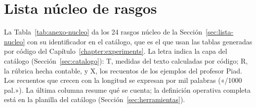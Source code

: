 \appendix
\renewcommand{\appendixname}{Anexo}

\chapter{Lista núcleo de rasgos}\label{app:nucleo}

La Tabla~\ref{tab:anexo-nucleo} da los 24 rasgos núcleo de la Sección~\ref{sec:lista-nucleo} con su
identificador en el catálogo, que es el que usan las tablas generadas por código del
Capítulo~\ref{chapter:experiments}. La letra indica la capa del catálogo
(Sección~\ref{sec:catalogo}): T, medidas del texto calculadas por código; R, la rúbrica hecha
contable, y X, los recuentos de los ejemplos del profesor Piad. Los recuentos que crecen con la longitud se
expresan por mil palabras («/1000 pal.»). La última columna resume qué se cuenta; la definición
operativa completa está en la planilla del catálogo (Sección~\ref{sec:herramientas}).


